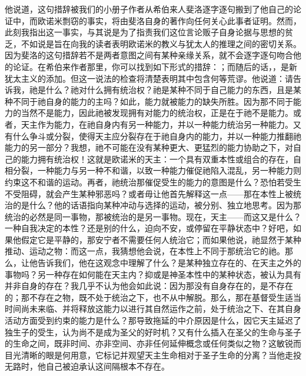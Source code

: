 他说道，这句措辞被我们的小册子作者从希伯来人斐洛逐字逐句搬到了他自己的论证中，而欧诺米剽窃的事实，将由斐洛自身的著作向任何关心此事者证明。然而，此刻我指出这一事实，与其说是为了指责我们这位言论贩子自身论据与思想的贫乏，不如说是旨在向我的读者表明欧诺米的教义与犹太人的推理之间的密切关系。因为斐洛的这句措辞若不是两者意图之间有某种亲缘关系，就不会逐字逐句吻合他的论证。在希伯来作者那里，你可以找到如下形式的措辞：；而随后的话，，是新犹太主义的添加。但这一说法的检查将清楚表明其中包含何等荒谬。他说道：请告诉我，祂是什么？祂对什么拥有统治权？祂是某种不同于自己能力的东西，且是某种不同于祂自身的能力的主吗？如此，能力就被能力的缺失所胜。因为那不同于能力的当然不是能力，因此祂被发现拥有对能力的统治权，正是在于祂不是能力。或者，天主作为能力，在祂自身内有另一种能力，并以一种能力统治另一种能力。又有什么争斗或分裂，使得天主应分裂存在于祂自身内的能力，并以一种能力推翻祂能力的另一部分？我想，祂不可能在没有某种更大、更猛烈的能力协助之下，对自己的能力拥有统治权！这就是欧诺米的天主：一个具有双重本性或组合的存在，自相分裂，一种能力与另一种不和谐，以致一种能力催促祂陷入混乱，另一种能力则约束这不和谐的运动。再者，祂统治那催促受生的能力的意图是什么？恐怕若受生不受阻碍，就会产生某种邪恶吗？或者毋让他首先解释这一点——那在本性上被统治的是什么？他的话语指向某种冲动与选择的运动，被分别、独立地思考。因为那统治的必然是同一事物，那被统治的是另一事物。现在，天主——而这又是什么？一种自我决定的本性？还是别的什么，迫向不安，或停留在平静状态中？好吧，如果他假定它是平静的，那安宁者不需要任何人统治它；而如果他说，祂显然于某种推动、运动之物：而这一点，我猜想他会说，在本性上不同于那统治它的祂。那么，让他告诉我们，他在这观念中理解了什么？是某种独立存在的、在天主之外的事物吗？另一种存在如何能在天主内？抑或是神圣本性中的某种状态，被认为具有并非自身的存在？我几乎不认为他会如此说：因为那没有自身存在的，是不存在的；那不存在之物，既不处于统治之下，也不从中解脱。那么，那在基督受生适当时间尚未来临、并将释放这能力以进行其自然运作之前，处于统治之下、在其自身活动方面受到约束的能力是什么？那导致拖延的中介原因是什么，因它天主延迟了独生子的受生，认为尚不是成为圣父的好时机？又有什么插入在圣父的生命与圣子的生命之间，既非时间、亦非空间、亦非任何延伸概念或任何类似之物？这敏锐而目光清晰的眼是何用意，它标记并观望天主生命相对于圣子生命的分离？当他走投无路时，他自己被迫承认这间隔根本不存在。\par


